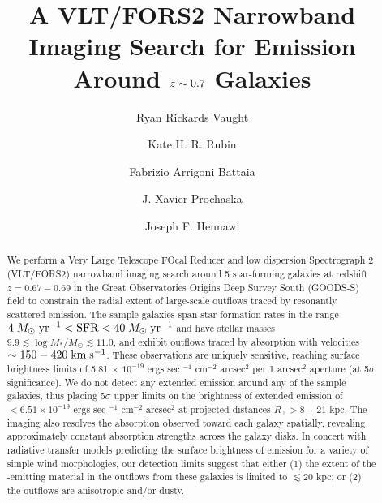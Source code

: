 \documentclass[twocolumn]{aastex62}
\def \mkms {{\rm \; km\;s^{-1}}}
\def \msunperyr {{\; M_{\odot}\rm \;yr^{-1}}}
\begin{document}
\title{A VLT/FORS2 Narrowband Imaging Search for  Emission Around $\lowercase{z}\sim0.7$ Galaxies }
\author{Ryan Rickards Vaught}
 
 
 \author{Kate H. R. Rubin}
 
 \author{Fabrizio Arrigoni Battaia }

 \author{J. Xavier Prochaska}
 
\author{Joseph F. Hennawi}


\begin{abstract}
We perform a Very Large Telescope FOcal Reducer and low dispersion Spectrograph 2 (VLT/FORS2) narrowband imaging search around 5 star-forming galaxies at redshift $z=0.67-0.69$ in the Great Observatories Origins Deep Survey South (GOODS-S) field to constrain the radial extent of large-scale outflows traced by resonantly scattered  emission. The sample galaxies span star formation rates in the range $4\msunperyr< \mathrm{SFR} < 40\msunperyr$ and have stellar masses $9.9 \lesssim \log M_{*}/M_{\odot} \lesssim 11.0$, and exhibit outflows traced by  absorption with velocities $\sim150-420\mkms$.
These observations are uniquely sensitive, reaching surface brightness limits of 5.81 $\times$ $10^{-19}$ ergs sec $^{-1}$ cm$^{-2}$ arcsec$^2$ per 1 arcsec$^2$ aperture (at 5$\sigma$ significance).  We do not detect any extended emission around any of the sample galaxies, thus placing 5$\sigma$ upper limits on the brightness of extended  emission of $<6.51 \times 10^{-19}$ ergs sec $^{-1}$ cm$^{-2}$ arcsec$^2$ at projected distances $R_{\perp} > 8-21$ kpc. The imaging also resolves the  absorption observed toward each galaxy spatially, revealing approximately constant absorption strengths across the galaxy disks. 
In concert with radiative transfer models predicting the surface brightness of  emission for a variety of simple wind morphologies, our detection limits suggest that either (1) the extent of the -emitting material in the outflows from these galaxies is limited to $\lesssim 20$ kpc; or (2) the outflows are anisotropic and/or dusty.  
\end{abstract}
\end{document}
